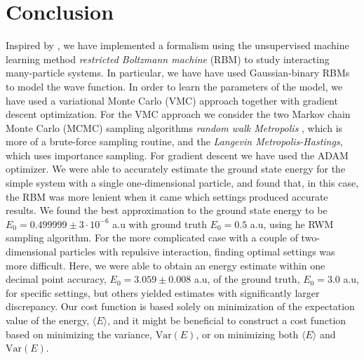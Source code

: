 \section{Conclusion}\label{sec:Conclusion}

Inspired by \cite{Carleo_2017}, we have implemented a formalism using the unsupervised machine learning method \textit{restricted Boltzmann machine} (RBM) to study interacting many-particle systems. In particular, we have have used Gaussian-binary RBMs to model the wave function. In order to learn the parameters of the model, we have used a variational Monte Carlo (VMC) approach together with gradient descent optimization. For the VMC approach we consider the two Markov chain Monte Carlo (MCMC) sampling algorithms \textit{random walk Metropolis }, which is more of a brute-force sampling routine, and the \textit{Langevin Metropolis-Hastings}, which uses importance sampling. For gradient descent we have used the ADAM optimizer. We were able to accurately estimate the ground state energy for the simple system with a single one-dimensional particle, and found that, in this case, the RBM was more lenient when it came which settings produced accurate results. We found the best approximation to the ground state energy to be $E_0 = 0.499999 \pm 3\cdot10^{-6}$ a.u with ground truth $E_0=0.5$ a.u, using he RWM sampling algorithm. For the more complicated case with a couple of two-dimensional particles with repulsive interaction, finding optimal settings was more difficult. Here, we were able to obtain an energy estimate within one decimal point accuracy, $E_0 = 3.059 \pm 0.008$ a.u, of the ground truth, $E_0=3.0$ a.u, for specific settings, but others yielded estimates with significantly larger discrepancy. Our cost function is based solely on minimization of the expectation value of the energy, $\langle E \rangle$, and it might be beneficial to construct a cost function based on minimizing the variance, $\mathrm{Var}(E)$, or on minimizing both $\langle E \rangle$ and $\mathrm{Var}(E)$. 







